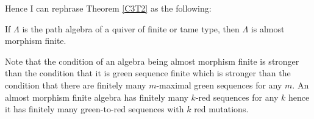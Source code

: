 \indent Hence I can rephrase Theorem \ref{C3T2} as the following:
\begin{theorem}
If $\Lambda$ is the path algebra of a quiver of finite or tame type, then $\Lambda$ is almost morphism finite.
\end{theorem}
\indent Note that the condition of an algebra being almost morphism finite is stronger than the condition that it is green sequence finite which is stronger than the condition that there are finitely many $m$-maximal green sequences for any $m$. An almost morphism finite algebra has finitely many $k$-red sequences for any $k$ hence it has finitely many green-to-red sequences with $k$ red mutations.\\